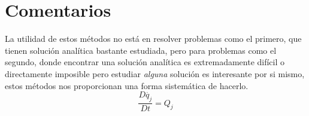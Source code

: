 \documentclass[a4paper,12pt]{article}
\begin{document}
\section{Comentarios}

La utilidad de estos métodos no está en resolver problemas como el primero, que tienen solución analítica bastante estudiada, pero para problemas como el segundo, donde encontrar una solución analítica es extremadamente difícil o directamente imposible pero estudiar \textit{alguna} solución es interesante por si mismo, estos métodos nos proporcionan una forma sistemática de hacerlo. $$\frac{D \dot{q_{j}}}{Dt}= Q_j$$
\printbibliography
\end{document}
